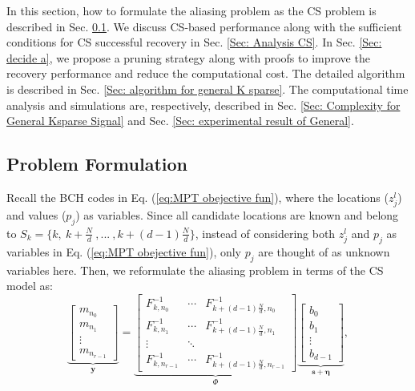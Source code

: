 \documentclass[journal,onecolumn,11pt]{IEEEtran}
\begin{document}
In this section, how to formulate the aliasing problem as the CS problem is described in Sec. \ref{Sec: Refinement}.
We discuss CS-based performance along with the sufficient conditions for CS successful recovery in Sec. \ref{Sec: Analysis CS}.
In Sec. \ref{Sec: decide a}, we propose a pruning strategy along with proofs to improve the recovery performance and reduce the computational cost.
The detailed algorithm is described in Sec. \ref{Sec: algorithm for general K sparse}.
The computational time analysis and simulations are, respectively, described in Sec. \ref{Sec: Complexity  for General Ksparse Signal} and Sec. \ref{Sec: experimental result of General}.



\subsection{Problem Formulation}\label{Sec: Refinement}
Recall the BCH codes in Eq. (\ref{eq:MPT obejective fun}), where the locations ($z_j^l$) and values ($p_j$) as variables.
Since all candidate locations are known and belong to $S_{k}=\{ k , \  k+\frac{N}{d} \  , ...\  ,  k+(d-1)\frac{N}{d}\}$, instead of considering both $z_j^l$ and $p_j$ as variables in Eq. (\ref{eq:MPT obejective fun}), only $p_{j}$ are thought of as unknown variables here.
Then, we reformulate the aliasing problem in terms of the CS model as:
\small
\begin{equation}
{\underbrace{\begin{bmatrix}
       m_{n_{0}}\\
       m_{n_{1}}\\
       \vdots \\
       m_{n_{r-1}}
\end{bmatrix}}_{\bm{y}}
= \underbrace{\begin{bmatrix}
       F_{k,n_{0}}^{-1}  &  \cdots   &   F_{k+(d-1)\frac{N}{d},n_{0}}^{-1}    \\
       F_{k,n_{1}}^{-1}          & \cdots  &  F_{k+(d-1)\frac{N}{d},n_{1}}^{-1} \\
        \vdots            & \ddots  &\\
       F_{k,n_{r-1}}^{-1}            & \cdots   &F_{k+(d-1)\frac{N}{d},n_{r-1}}^{-1}
\end{bmatrix}
}_{\Phi}
\underbrace{
\begin{bmatrix}
       b_{0}     \\
       b_{1}        \\
        \vdots\\
       b_{d-1}
\end{bmatrix}}_{\bm{s}+\bm{\eta}}},
\label{eq:CS Formulation}
\end{equation}
\end{document}

